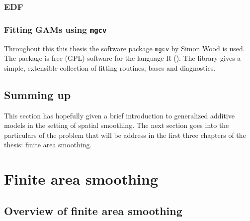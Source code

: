 \subsubsection{EDF}
\label{GAMEDF}
%

\subsubsection{Fitting GAMs using \texttt{mgcv}}
\label{intro-mgcv}

Throughout this this thesis the software package \texttt{mgcv} by Simon Wood is used. The package is free (GPL) software for the language \textsf{R} (\cite{Rsoftware}). The library gives a simple, extensible collection of fitting routines, bases and diagnostics.


\subsection{Summing up}

This section has hopefully given a brief introduction to generalized additive models in the setting of spatial smoothing. The next section goes into the particulars of the problem that will be address in the first three chapters of the thesis: finite area smoothing.


\section{Finite area smoothing}
\label{intro-FAS}

\subsection{Overview of finite area smoothing}

